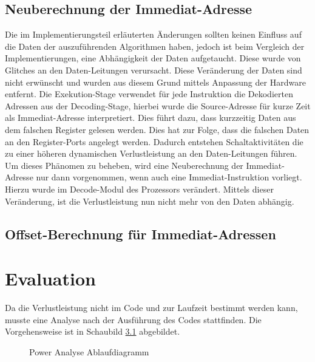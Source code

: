\section{Neuberechnung der Immediat-Adresse}
Die im Implementierungsteil erläuterten Änderungen sollten keinen Einfluss auf die Daten der auszuführenden Algorithmen haben, jedoch ist beim Vergleich der Implementierungen, eine Abhängigkeit der Daten aufgetaucht.
Diese wurde von Glitches an den Daten-Leitungen verursacht. Diese Veränderung der Daten sind nicht erwünscht und wurden aus diesem Grund mittels Anpassung der Hardware entfernt.
Die Exekution-Stage verwendet für jede Instruktion die Dekodierten Adressen aus der Decoding-Stage, hierbei wurde die Source-Adresse für kurze Zeit als Immediat-Adresse interpretiert. Dies führt dazu, dass kurzzeitig Daten aus dem falschen Register gelesen werden. Dies hat zur Folge, dass die falschen Daten an den Register-Ports angelegt werden. Dadurch entstehen Schaltaktivitäten die zu einer höheren dynamischen Verlustleistung an den Daten-Leitungen führen. Um dieses Phänomen zu beheben,  wird eine Neuberechnung der Immediat-Adresse nur dann vorgenommen, wenn auch eine Immediat-Instruktion vorliegt. Hierzu wurde im Decode-Modul des Prozessors verändert. 
Mittels dieser Veränderung, ist die Verlustleistung nun nicht mehr von den Daten abhängig.

\section{Offset-Berechnung für Immediat-Adressen}


\chapter{Evaluation}
\label{chap:evaluation} 
Da die Verlustleistung nicht im Code und zur Laufzeit bestimmt werden kann, musste eine Analyse nach der Ausführung des Codes stattfinden. Die Vorgehensweise ist in Schaubild \ref{fig:flow_power_analyse} abgebildet.

\begin{scriptsize}
	\begin{figure}[htbp] 
		\centering
		
		\caption{Power Analyse Ablaufdiagramm}
		\label{fig:flow_power_analyse}
	\end{figure}
\end{scriptsize}


